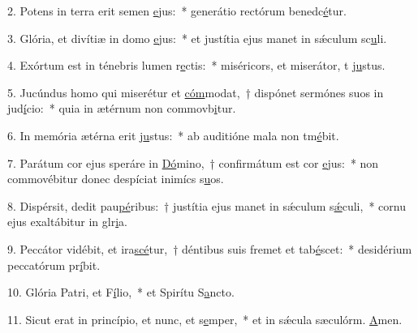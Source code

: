 2. Potens in terra erit semen \uline{e}jus:~* generátio rectórum benedc\uline{é}tur.\par 
3. Glória, et divítiæ in domo \uline{e}jus:~* et justítia ejus manet in sǽculum sc\uline{u}li.\par 
4. Exórtum est in ténebris lumen r\uline{e}ctis:~* miséricors, et miserátor, t j\uline{u}stus.\par 
5. Jucúndus homo qui miserétur et \uline{cóm}modat,~† dispónet sermónes suos in jud\uline{í}cio:~* quia in ætérnum non commovb\uline{i}tur.\par 
6. In memória ætérna erit j\uline{u}stus:~* ab auditióne mala non tm\uline{é}bit.\par 
7. Parátum cor ejus speráre in \uline{Dó}mino,~† confirmátum est cor \uline{e}jus:~* non commovébitur donec despíciat inimícs s\uline{u}os.\par 
8. Dispérsit, dedit pau\uline{pé}ribus:~† justítia ejus manet in sǽculum s\uline{ǽ}culi,~* cornu ejus exaltábitur in glr\uline{i}a.\par 
9. Peccátor vidébit, et ira\uline{scé}tur,~† déntibus suis fremet et tab\uline{é}scet:~* desidérium peccatórum pr\uline{í}bit.\par 
10. Glória Patri, et F\uline{í}lio,~* et Spirítu S\uline{a}ncto.\par 
11. Sicut erat in princípio, et nunc, et s\uline{e}mper,~* et in sǽcula sæculórm. \uline{A}men.\par 
